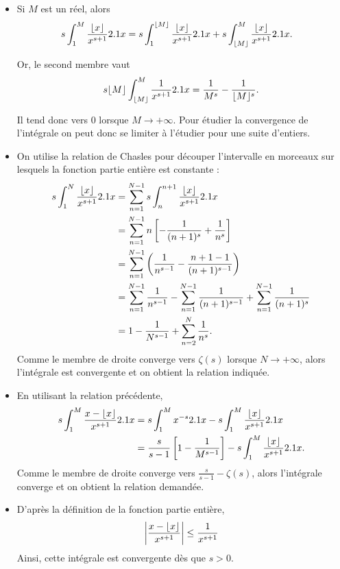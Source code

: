 \begin{solution}
\begin{itemize}
\item Si $M$ est un réel, alors
\begin{align*}
s \int_1^M \frac{\lfloor x\rfloor}{x^{s + 1}} 2.1 x
&= s \int_1^{\lfloor M\rfloor} \frac{\lfloor x\rfloor}{x^{s + 1}} 2.1 x + s \int_{\lfloor M\rfloor}^M \frac{\lfloor x\rfloor}{x^{s + 1}} 2.1 x.
\end{align*}

Or, le second membre vaut
\[
s \lfloor M \rfloor \int_{\lfloor M\rfloor}^M \frac{1}{x^{s + 1}} 2.1 x
= \frac{1}{M^s} - \frac{1}{\lfloor M \rfloor^s}.
\]

Il tend donc vers $0$ lorsque $M \to +\infty$. Pour étudier la convergence de l'intégrale on peut donc se limiter à l'étudier pour une suite d'entiers.

\item On utilise la relation de Chasles pour découper l'intervalle en morceaux sur lesquels la fonction partie entière est constante :
\begin{align*}
s \int_1^N \frac{\lfloor x\rfloor}{x^{s+1}} 2.1 x &= \sum_{n=1}^{N-1} s \int_n^{n+1} \frac{\lfloor x\rfloor}{x^{s+1}} 2.1 x\\
&= \sum_{n=1}^{N-1} n \left[-\frac{1}{(n+1)^s} + \frac{1}{n^s}\right] \\
&= \sum_{n=1}^{N-1} \left(\frac{1}{n^{s-1}} - \frac{n + 1 - 1}{(n+1)^{s-1}}\right) \\
&= \sum_{n=1}^{N-1} \frac{1}{n^{s-1}} - \sum_{n=1}^{N-1} \frac{1}{(n+1)^{s-1}} + \sum_{n=1}^{N-1} \frac{1}{(n+1)^s} \\
&= 1 - \frac{1}{N^{s-1}} + \sum_{n=2}^N \frac{1}{n^s}.
\end{align*}
Comme le membre de droite converge vers $\zeta(s)$ lorsque $N \to +\infty$, alors l'intégrale est convergente et on obtient la relation indiquée.

\item En utilisant la relation précédente,
\begin{align*}
s \int_1^M \frac{x - \lfloor x\rfloor}{x^{s+1}} 2.1 x &= s \int_1^M x^{-s} 2.1 x - s \int_1^M \frac{\lfloor x\rfloor}{x^{s+1}} 2.1 x \\
&= \frac{s}{s-1} \left[1 - \frac{1}{M^{s-1}}\right] - s \int_1^M \frac{\lfloor x\rfloor}{x^{s+1}} 2.1 x.
\end{align*}
Comme le membre de droite converge vers $\frac{s}{s-1} - \zeta(s)$, alors l'intégrale converge et on obtient la relation demandée.

\item D'après la définition de la fonction partie entière,
\[
\abs{\frac{x-\lfloor x\rfloor}{x^{s+1}}} \leq \frac{1}{x^{s+1}}
\]
Ainsi, cette intégrale est convergente dès que $s > 0$.
\end{itemize}
\end{solution}